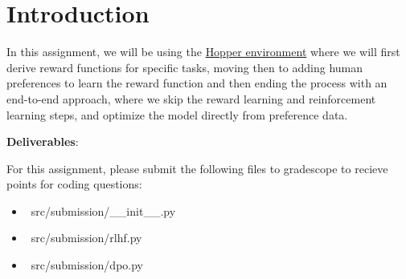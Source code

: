 \section{Introduction}

In this assignment, we will be using the \href{https://gymnasium.farama.org/environments/mujoco/hopper/}{Hopper environment} where we will first derive reward functions for specific tasks, 
moving then to adding human preferences to learn the reward function and then ending the process with an end-to-end approach, where we skip the reward learning and reinforcement learning steps, 
and optimize the model directly from preference data.

\textbf{Deliverables}:

For this assignment, please submit the following files to gradescope to recieve points for coding questions:

\begin{itemize}
    \item ~src/submission/__init__.py~
    \item ~src/submission/rlhf.py~
    \item ~src/submission/dpo.py~\\
\end{itemize}